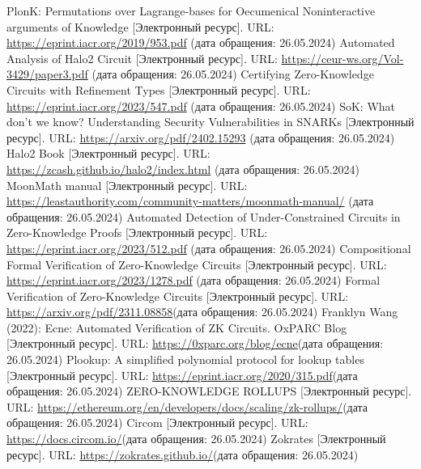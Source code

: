\documentclass[a4paper]{article}
\begin{document}
\begin{thebibliography}{}
      PlonK: Permutations over Lagrange-bases for Oecumenical Noninteractive arguments of Knowledge [Электронный ресурс]. URL: \href{https://eprint.iacr.org/2019/953.pdf}{https://eprint.iacr.org/2019/953.pdf} (дата обращения: 26.05.2024)
      Automated Analysis of Halo2 Circuit [Электронный ресурс]. URL: \href{https://ceur-ws.org/Vol-3429/paper3.pdf}{https://ceur-ws.org/Vol-3429/paper3.pdf} (дата обращения: 26.05.2024)
      Certifying Zero-Knowledge Circuits with Refinement Types [Электронный ресурс]. URL: \href{https://eprint.iacr.org/2023/547.pdf}{https://eprint.iacr.org/2023/547.pdf} (дата обращения: 26.05.2024)
      SoK: What don’t we know? Understanding Security Vulnerabilities in SNARKs [Электронный ресурс]. URL: \href{https://arxiv.org/pdf/2402.15293}{https://arxiv.org/pdf/2402.15293} (дата обращения: 26.05.2024)
      Halo2 Book [Электронный ресурс]. 
    URL: \href{https://zcash.github.io/halo2/index.html}{https://zcash.github.io/halo2/index.html}
    (дата обращения: 26.05.2024)
      MoonMath manual [Электронный ресурс]. URL: \href{https://leastauthority.com/community-matters/moonmath-manual/}{https://leastauthority.com/community-matters/moonmath-manual/} (дата обращения: 26.05.2024)
      Automated Detection of Under-Constrained Circuits in Zero-Knowledge Proofs [Электронный ресурс]. URL: \href{https://eprint.iacr.org/2023/512.pdf}{https://eprint.iacr.org/2023/512.pdf} (дата обращения: 26.05.2024)
      Compositional Formal Verification
    of Zero-Knowledge Circuits [Электронный ресурс]. URL: \href{https://eprint.iacr.org/2023/1278.pdf}{https://eprint.iacr.org/2023/1278.pdf} (дата обращения: 26.05.2024)
      Formal Verification of Zero-Knowledge Circuits [Электронный ресурс]. URL: \href{https://arxiv.org/pdf/2311.08858}{https://arxiv.org/pdf/2311.08858}(дата обращения: 26.05.2024)
      Franklyn Wang (2022): Ecne: Automated Verification of ZK Circuits. OxPARC Blog [Электронный ресурс]. URL: \href{https://0xparc.org/blog/ecne}{https://0xparc.org/blog/ecne}(дата обращения: 26.05.2024)
      Plookup: A simplified polynomial protocol for
    lookup tables [Электронный ресурс]. URL: \href{https://eprint.iacr.org/2020/315.pdf}{https://eprint.iacr.org/2020/315.pdf}(дата обращения: 26.05.2024)
      ZERO-KNOWLEDGE ROLLUPS [Электронный ресурс]. URL: \href{https://ethereum.org/en/developers/docs/scaling/zk-rollups/}{https://ethereum.org/en/developers/docs/scaling/zk-rollups/}(дата обращения: 26.05.2024)
      Circom [Электронный ресурс]. URL: \href{https://docs.circom.io/}{https://docs.circom.io/}(дата обращения: 26.05.2024)
      Zokrates [Электронный ресурс]. URL: \href{https://zokrates.github.io/}{https://zokrates.github.io/}(дата обращения: 26.05.2024)
\end{thebibliography}
\end{document}
